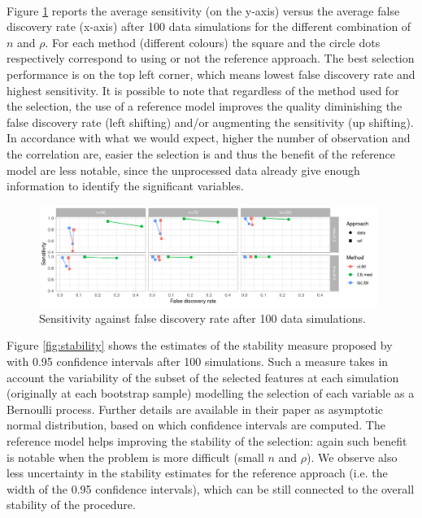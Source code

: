 \documentclass[american,]{article}
\theoremstyle{definition}
\begin{document}
\\
Figure \ref{fig:sensitivity_vs_fdr} reports the average sensitivity (on the y-axis) versus the average false discovery rate (x-axis) after 100 data simulations for the different combination of $n$ and $\rho$. For each method (different colours) the square and the circle dots respectively correspond to using or not the reference approach. The best selection performance is on the top left corner, which means lowest false discovery rate and highest sensitivity. It is possible to note that regardless of the method used for the selection, the use of a reference model improves the quality diminishing the false discovery rate (left shifting) and/or augmenting the sensitivity (up shifting). In accordance with what we would expect, higher the number of observation and the correlation are, easier the selection is and thus the benefit of the reference model are less notable, since the unprocessed data already give enough information to identify the significant variables.

\begin{figure}[tp]
  \centering
  \includegraphics[width=0.98\textwidth]{graphics/sensitivity_vs_fdr.pdf}
  \caption{Sensitivity against false discovery rate after 100 data simulations.\\}
  \label{fig:sensitivity_vs_fdr}
\end{figure}

Figure \ref{fig:stability} shows the estimates of the stability measure proposed by \cite{paper:stability} with 0.95 confidence intervals after 100 simulations. Such a measure takes in account the variability of the subset of the selected features at each simulation (originally at each bootstrap sample) modelling the selection of each variable as a Bernoulli process. Further details are available in their paper as asymptotic normal distribution, based on which confidence intervals are computed. The reference model helps improving the stability of the selection: again such benefit is notable when the problem is more difficult (small $n$ and $\rho$). We observe also less uncertainty in the stability estimates for the reference approach (i.e. the width of the 0.95 confidence intervals), which can be still connected to the overall stability of the procedure.
\end{document}
